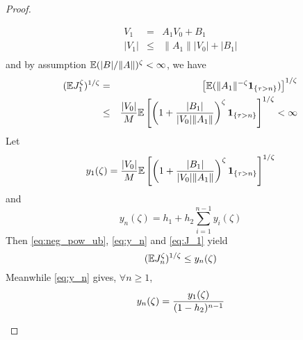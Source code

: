 \documentclass{article}
\theoremstyle{remark}
\begin{document}
\begin{proof}
\begin{enumerate}
\begin{eqnarray*}
      V_1 &=& A_1 V_0 + B_1 \\
      |V_1| &\leq& \|A_1\| |V_0| + |B_1| \\
      \end{eqnarray*}
      and by assumption $\mathbb{E} (|B|/\|A\|)^\zeta < \infty$, we have
      \begin{eqnarray}
        (\mathbb{E} J_1^\zeta)^{1/\zeta} &=&
        \left[
        \mathbb{E} (\|A_1\|^{-\zeta}\mathbf{1}_{\{\tau > n\}})
      \right]^{1/\zeta} \nonumber \\
      &\leq&
      {|V_0|\over M} \mathbb{E} \left[\left(
        1 + {|B_1| \over |V_0| \|A_1\|}
      \right)^\zeta
      \mathbf{1}_{\{\tau > n\}}\right]^{1/\zeta}< \infty
    \label{eq:J_1}
    \end{eqnarray}
    Let
    \[
    y_1(\zeta) = 
    {|V_0|\over M} \mathbb{E} \left[\left(
        1 + {|B_1| \over |V_0| \|A_1\|}
      \right)^\zeta \mathbf{1}_{\{\tau > n\}}\right]^{1/\zeta}
    \]
    and
    \begin{equation}
      \label{eq:y_n}
      y_n(\zeta) = h_1 + h_2 \sum_{i=1}^{n-1} y_i(\zeta)
    \end{equation}
    Then \eqref{eq:neg_pow_ub}, \eqref{eq:y_n} and \eqref{eq:J_1}
    yield
    \begin{equation}
      \label{eq:J_n_2}
      (\mathbb{E} J_n^\zeta)^{1/\zeta} \leq y_n(\zeta)
    \end{equation}
    Meanwhile \eqref{eq:y_n} gives, $\forall n \geq 1$,
    \begin{equation}
      \label{eq:y_n_2}
      y_n(\zeta) = {y_1(\zeta) \over (1 - h_2)^{n-1}}
    \end{equation}


\end{enumerate}
\end{proof}
\end{document}
